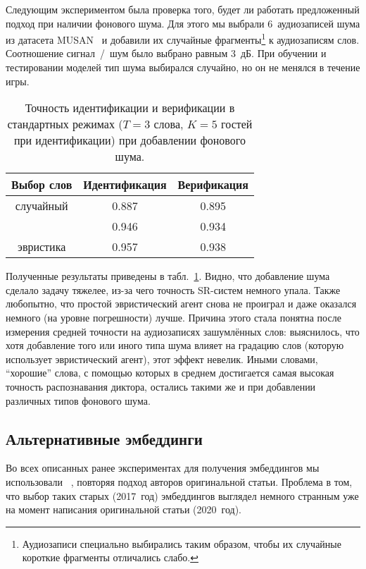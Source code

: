 Следующим экспериментом была проверка того, будет ли работать предложенный
подход при наличии фонового шума. Для этого мы выбрали 6~аудиозаписей шума
из датасета MUSAN~\cite{musan2015} и добавили их случайные фрагменты\footnote{
    Аудиозаписи специально выбирались таким образом, чтобы их случайные
    короткие фрагменты отличались слабо.
} к аудиозаписям слов. Соотношение сигнал~/~шум было выбрано равным 3~дБ.
При обучении и тестировании моделей тип шума выбирался случайно, но он не
менялся в течение игры.

\begin{table}[htb]
    \centering
    \begin{tabular}{c c c}
        \toprule
        Выбор слов & Идентификация & Верификация\\
        \midrule
        случайный & 0.887 & 0.895\\
        \enquirer{} & 0.946 & 0.934\\
        эвристика & 0.957 & 0.938\\
        \bottomrule
    \end{tabular}
    \caption{Точность идентификации и верификации в стандартных режимах
    ($T = 3$ слова, $K = 5$ гостей при идентификации) при добавлении фонового
    шума.}
    \label{tab:noise}
\end{table}

Полученные результаты приведены в табл.~\ref{tab:noise}. Видно, что добавление
шума сделало задачу тяжелее, из-за чего точность SR-систем немного упала. Также
любопытно, что простой эвристический агент снова не проиграл \enquirer{} и даже
оказался немного (на уровне погрешности) лучше. Причина этого стала понятна
после измерения средней точности \guesser{} на аудиозаписях зашумлённых слов:
выяснилось, что хотя добавление того или иного типа шума влияет на градацию слов
(которую использует эвристический агент), этот эффект невелик. Иными словами,
``хорошие'' слова, с помощью которых в среднем достигается самая высокая
точность распознавания диктора, остались такими же и при добавлении различных
типов фонового шума.

\subsection{Альтернативные эмбеддинги}\label{ssec:cpc}

Во всех описанных ранее экспериментах для получения эмбеддингов мы использовали
\xvector{}~\cite{xvectorspaper}, повторяя подход авторов оригинальной статьи.
Проблема в том, что выбор таких старых (2017~год) эмбеддингов выглядел немного
странным уже на момент написания оригинальной статьи (2020~год).%

